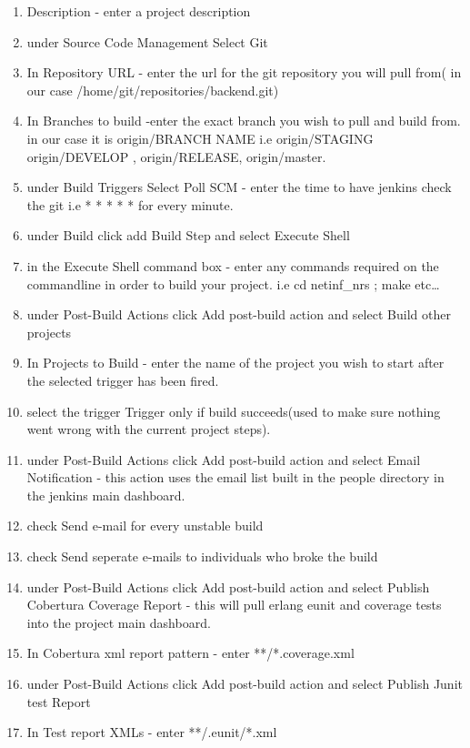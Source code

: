 \begin{enumerate}
\item Description - enter a project description
\item under Source Code Management Select Git
\item In Repository URL - enter the url for the git repository you will pull from( in our case /home/git/repositories/backend.git)
\item In Branches to build -enter the exact branch you wish to pull and build from. in our case it is origin/BRANCH NAME i.e  origin/STAGING origin/DEVELOP , origin/RELEASE, origin/master. 
\item under Build Triggers Select Poll SCM - enter the time to have jenkins check the git i.e  * * * * * for every minute.
\item under Build click add Build Step and select Execute Shell
\item in the Execute Shell command box - enter any commands required on the commandline in order to build your project. i.e cd netinf\_nrs ; make  etc\ldots
\item under Post-Build Actions click Add post-build action and select Build other projects
\item In Projects to Build - enter the name of the project you wish to start after the selected trigger has been fired.
\item select the trigger Trigger only if build succeeds(used to make sure nothing went wrong with the current project steps).
\item under Post-Build Actions click Add post-build action  and select Email Notification - this action uses the email list built in the people directory in the jenkins main dashboard.
\item check Send e-mail for every unstable build 
\item check Send seperate e-mails to individuals who broke the build 
\item under Post-Build Actions click Add post-build action and select Publish Cobertura Coverage Report	- this will pull erlang eunit and coverage tests into the project main dashboard.
\item In Cobertura xml report pattern - enter  **/*.coverage.xml
\item under Post-Build Actions click Add post-build action and select Publish Junit test Report
\item In Test report XMLs - enter **/.eunit/*.xml

\end{enumerate}

